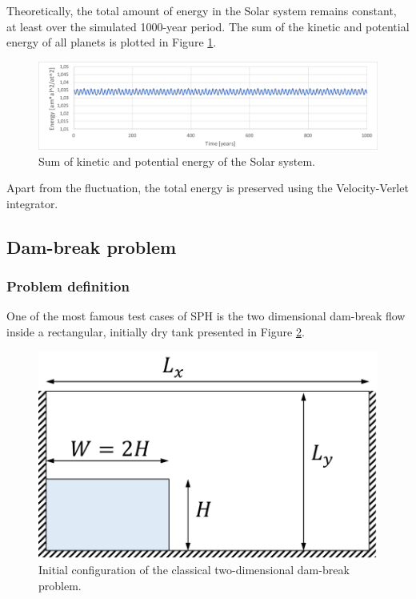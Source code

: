 \documentclass[a4paper,12pt,openany]{book}
\theoremstyle{break}
\begin{document}
Theoretically, the total amount of energy in the Solar system remains constant, at least over the simulated 1000-year period. The sum of the kinetic and potential energy of all planets is plotted in Figure \ref{fig:solar_system_energy}.
\begin{figure}[H]
  \includegraphics[scale=0.5]{solar_system_energy.pdf}
  \centering
  \caption{Sum of kinetic and potential energy of the Solar system. }
  \label{fig:solar_system_energy}
\end{figure}\vspace*{3pt}
Apart from the fluctuation, the total energy is preserved using the Velocity-Verlet integrator.


\subsection{Dam-break problem}
\subsubsection{Problem definition}
One of the most famous test cases of SPH is the two dimensional dam-break flow inside a rectangular, initially dry tank presented in Figure \ref{fig:dambreak_geom}.
\begin{figure}[H]
  \includegraphics[scale=0.6]{dam_break_geom.pdf}
  \centering
  \caption{Initial configuration of the classical two-dimensional dam-break problem.}
  \label{fig:dambreak_geom}
\end{figure}\vspace*{3pt}
\end{document}
